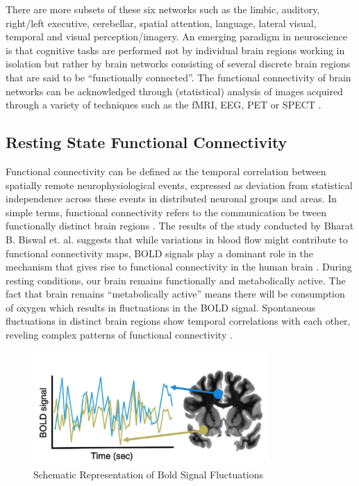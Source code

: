 ﻿\documentclass[12pt]{article}
\begin{document}
There are more subsets of these six networks such as the limbic,
auditory, right/left executive, cerebellar, spatial attention,
language, lateral visual, temporal and visual perception/imagery. An
emerging paradigm in neuroscience is that cognitive tasks are
performed not by individual brain regions working in isolation but
rather by brain networks consisting of several discrete brain regions
that are said to be ``functionally connected''. The functional
connectivity of brain networks can be acknowledged through
(statistical) analysis of images acquired through a variety of
techniques such as the fMRI, EEG, PET or SPECT
\cite{wikibrainnetworks}.

\subsection{Resting State Functional Connectivity}

Functional connectivity can be defined as the temporal correlation
between spatially remote neurophysiological events, expressed as
deviation from statistical independence across these events in
distributed neuronal groups and areas. In simple terms, functional
connectivity refers to the communication be tween functionally
distinct brain regions \cite{functionalConnectivityNikin}. The results
of the study conducted by Bharat B. Biswal et. al. suggests that while
variations in blood flow might contribute to functional connectivity
maps, BOLD signals play a dominant role in the mechanism that gives
rise to functional connectivity in the human brain
\cite{biswalsimultaneous}. During resting conditions, our brain
remains functionally and metabolically active. The fact that brain
remains ``metabolically active'' means there will be consumption of
oxygen which results in fluctuations in the BOLD signal. Spontaneous
fluctuations in distinct brain regions show temporal correlations with
each other, reveling complex patterns of functional connectivity
\cite{biswal1995functional}.

\begin{figure}[H]
  \centering
  \includegraphics[width=0.8\textwidth]{rsfc.png}
  \caption{Schematic Representation of Bold Signal Fluctuations}
\end{figure}
\end{document}
